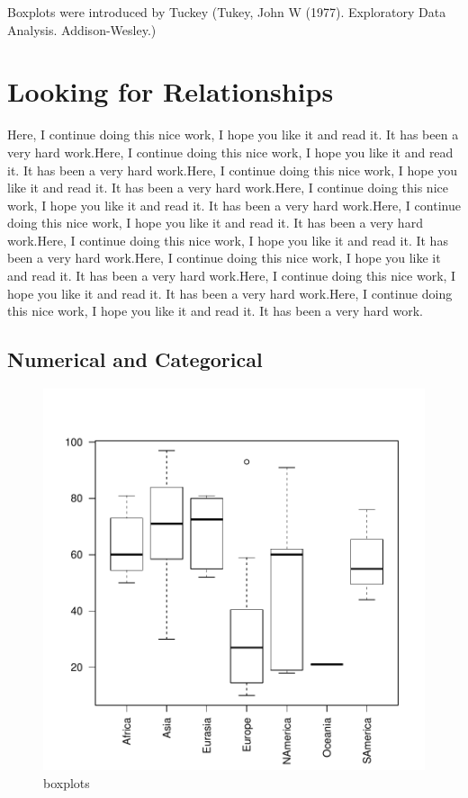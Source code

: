 \documentclass[11pt]{article}
\begin{document}
Boxplots were introduced by Tuckey (Tukey, John W (1977). Exploratory Data Analysis. Addison-Wesley.)

\section{Looking for Relationships}\label{bivar}


Here, I continue doing this nice work, I hope you like it and read it. It has been a very hard work.Here, I continue doing this nice work, I hope you like it and read it. It has been a very hard work.Here, I continue doing this nice work, I hope you like it and read it. It has been a very hard work.Here, I continue doing this nice work, I hope you like it and read it. It has been a very hard work.Here, I continue doing this nice work, I hope you like it and read it. It has been a very hard work.Here, I continue doing this nice work, I hope you like it and read it. It has been a very hard work.Here, I continue doing this nice work, I hope you like it and read it. It has been a very hard work.Here, I continue doing this nice work, I hope you like it and read it. It has been a very hard work.Here, I continue doing this nice work, I hope you like it and read it. It has been a very hard work.

\subsection{Numerical and  Categorical}\label{binumcat}


\begin{figure}[h]
\centering                                  %
\begin{adjustbox}{width=7cm,height=7cm,clip,trim=0cm 0cm 0cm 0cm} 
\includegraphics{PaperInR_6-numcat_plot}
\end{adjustbox}
\caption{boxplots}  %
\label{numcat_plot} %
\end{figure}
\end{document}
